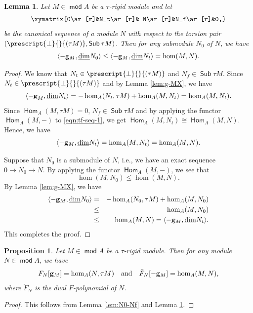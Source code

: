 \documentclass[10pt]{amsart}
\newtheorem{proposition}[theorem]{Proposition}
\newtheorem{lemma}[theorem]{Lemma}
\theoremstyle{definition}
\theoremstyle{remark}
\numberwithin{equation}{section}
\def\mod{\opname{mod}\nolimits}
\newcommand{\opname}[1]{\operatorname{\mathsf{#1}}}
\newcommand{\Hom}{\opname{Hom}}
\newcommand{\Sub}{\opname{Sub}}
\begin{document}
\begin{lemma}\label{lem:N0-Nt}
Let $M\in\mod A$ be a $\tau$-rigid module and  let \begin{eqnarray}\label{eqn:tf-seq-1}
\xymatrix{0\ar[r]&N_t\ar[r]& N\ar[r]&N_f\ar[r]&0,}
\end{eqnarray}
be the canonical sequence of a module $N$ with respect to the torsion pair  $(\prescript{\bot}{}{(\tau M)}, \Sub \tau M)$. Then for any submodule $N_0$ of $N$, we have 
\[
\langle -{\bf g}_M, \underline{\dim} N_0\rangle\leq \langle -{\bf g}_M, \underline{\dim} N_t\rangle=
 \hom(M, N).
\]
\end{lemma}
\begin{proof}
     We know that $N_t\in\prescript{\bot}{}{(\tau M)}$ and $N_f\in \Sub \tau M$.  Since $N_t\in \prescript{\bot}{}{(\tau M)}$ and by Lemma \ref{lem:g-MX}, we have
\[\langle {-\bf g}_M, \underline{\dim} N_t\rangle=-\hom_A(N_t,\tau M)+\hom_A(M,N_t)=\hom_A(M,N_t).\]
Since $\Hom_A(M,\tau M)=0$, $N_f\in \Sub \tau M$ and by applying the functor $\Hom_A(M,-)$ to \eqref{eqn:tf-seq-1}, we get $\Hom_A(M,N_t)\cong \Hom_A(M,N)$. Hence, we have 
\[\langle -{\bf g}_M,\underline{\dim} N_t\rangle=\hom_A(M,N_t)=\hom_A(M,N).\]

Suppose that $N_0$ is a submodule of $N$, i.e., we have an exact sequence $0\to N_0\to N$. By applying the functor $\Hom_A(M,-)$, we see that 
\[ \hom(M,N_0)\leq \hom(M,N).\]
By Lemma \ref{lem:g-MX}, we have
\begin{eqnarray*}\label{eqn:N0-Nf}
    \langle -{\bf g}_M, \underline{\dim} N_0\rangle&=&-\hom_A(N_0,\tau M)+\hom_A(M,N_0)\\
    &\leq& \hom_A(M, N_0) \\
    &\leq&  \hom_A(M, N)=\langle- {\bf g}_M, \underline{\dim} N_t\rangle.
\end{eqnarray*}
This completes the proof.
\end{proof}

\begin{proposition}\label{pro:check-F}
    Let $M\in\mod A$ be a $\tau$-rigid module. Then for any module $N\in\mod A$, we have 
    \[ F_N[{\bf g}_M]=\hom_A(N,\tau M)\quad\text{and}\quad \check F_N[-{\bf g}_M]=\hom_A(M,N),
    \]
    where $\check{F}_N$ is the dual $F$-polynomial of $N$. 
\end{proposition}
\begin{proof}
    This follows from Lemma \ref{lem:N0-Nf} and Lemma \ref{lem:N0-Nt}.
\end{proof}
\end{document}
